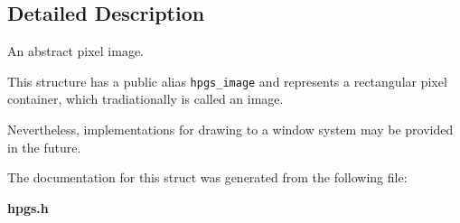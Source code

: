 \subsection{Detailed Description}
An abstract pixel image. 

This structure has a public alias {\tt hpgs\_\-image} and represents a rectangular pixel container, which tradiationally is called an image.

Nevertheless, implementations for drawing to a window system may be provided in the future. 

The documentation for this struct was generated from the following file:\begin{CompactItemize}
\item 
{\bf hpgs.h}\end{CompactItemize}
